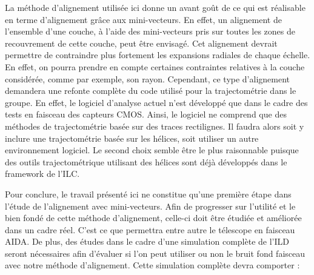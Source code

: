 
  
  \medskip
  
  La m\'ethode d'alignement utilis\'ee ici donne un avant goût de ce qui est r\'ealisable en terme d'alignement gr\^ace aux mini-vecteurs. En effet, un alignement de l'ensemble d'une couche, \`a l'aide des mini-vecteurs pris sur toutes les zones de recouvrement de cette couche, peut \^etre envisag\'e. Cet alignement devrait permettre de contraindre plus fortement les expansions radiales de chaque \'echelle. En effet, on pourra prendre en compte certaines contraintes relatives \`a la couche consid\'er\'ee, comme par exemple, son rayon. Cependant, ce type d'alignement demandera une refonte compl\`ete du code utilis\'e pour la trajectom\'etrie dans le groupe. En effet, le logiciel d'analyse actuel n'est d\'evelopp\'e que dans le cadre des tests en faisceau des capteurs CMOS. Ainsi, le logiciel ne comprend que des m\'ethodes de trajectom\'etrie bas\'ee sur des traces rectilignes. Il faudra alors soit y inclure une trajectom\'etrie bas\'ee sur les h\'elices, soit utiliser un autre environnement logiciel. Le second choix semble \^etre le plus raisonnable puisque des outils trajectom\'etrique utilisant des h\'elices sont d\'ejà d\'evelopp\'es dans le framework de l'ILC.
  
  
  \medskip
  
  Pour conclure, le travail pr\'esent\'e ici ne constitue qu'une premi\`ere \'etape dans l'\'etude de l'alignement avec mini-vecteurs. Afin de progresser sur l'utilit\'e et le bien fond\'e de cette m\'ethode d'alignement, celle-ci doit \^etre \'etudi\'ee et am\'elior\'ee dans un cadre r\'eel. C'est ce que permettra entre autre le t\'elescope en faisceau AIDA. De plus, des \'etudes dans le cadre d'une simulation compl\`ete de l'ILD seront n\'ecessaires afin d'\'evaluer si l'on peut utiliser ou non le bruit fond faisceau avec notre m\'ethode d'alignement. Cette simulation compl\`ete devra comporter :
  
